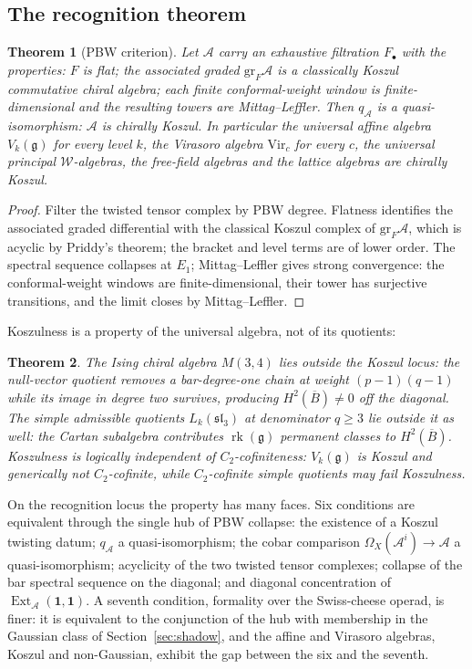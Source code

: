 \documentclass[11pt]{amsart}
\numberwithin{equation}{section}
\theoremstyle{plain}
\newtheorem{theorem}{Theorem}[section]
\theoremstyle{definition}
\theoremstyle{remark}
\newcommand{\cA}{\mathcal{A}}
\newcommand{\cW}{\mathcal{W}}
\newcommand{\fg}{\mathfrak{g}}
\newcommand{\barB}{\overline{B}}
\newcommand{\Vir}{\mathrm{Vir}}
\begin{document}
\subsection{The recognition theorem}

\begin{theorem}[PBW criterion]\label{thm:pbw}
Let $\cA$ carry an exhaustive filtration $F_\bullet$ with the properties:
$F$ is flat; the associated graded $\mathrm{gr}_F\cA$ is a classically
Koszul commutative chiral algebra; each finite conformal-weight window is
finite-dimensional and the resulting towers are Mittag--Leffler. Then
$q_{\cA}$ is a quasi-isomorphism: $\cA$ is chirally Koszul. In particular
the universal affine algebra $V_k(\fg)$ for every level $k$, the Virasoro
algebra $\Vir_c$ for every $c$, the universal principal
$\cW$-algebras, the free-field algebras and the lattice algebras are
chirally Koszul.
\end{theorem}

\begin{proof}
Filter the twisted tensor complex by PBW degree. Flatness identifies the
associated graded differential with the classical Koszul complex of
$\mathrm{gr}_F\cA$, which is acyclic by Priddy's theorem; the bracket and
level terms are of lower order. The spectral sequence collapses at $E_1$;
Mittag--Leffler gives strong convergence: the conformal-weight windows are
finite-dimensional, their tower has surjective transitions, and the
limit closes by Mittag--Leffler.
\end{proof}

Koszulness is a property of the universal algebra, not of its quotients:

\begin{theorem}\label{thm:non-koszul}
The Ising chiral algebra $M(3,4)$ lies outside the Koszul locus: the null-vector
quotient removes a bar-degree-one chain at weight $(p-1)(q-1)$ while its
image in degree two survives, producing $H^{2}(\barB)\neq0$ off the
diagonal. The simple admissible quotients $L_k(\mathfrak{sl}_3)$ at
denominator $q\geq3$ lie outside it as well: the Cartan subalgebra
contributes $\operatorname{rk}(\fg)$ permanent classes to $H^{2}(\barB)$.
Koszulness is logically independent of $C_2$-cofiniteness: $V_k(\fg)$ is
Koszul and generically not $C_2$-cofinite, while $C_2$-cofinite simple
quotients may fail Koszulness.
\end{theorem}

On the recognition locus the property has many faces. Six conditions are
equivalent through the single hub of PBW collapse: the existence of a
Koszul twisting datum; $q_{\cA}$ a quasi-isomorphism; the cobar comparison
$\Omega_X(\cA^{i})\to\cA$ a quasi-isomorphism; acyclicity of the two
twisted tensor complexes; collapse of the bar spectral sequence on the
diagonal; and diagonal concentration of
$\operatorname{Ext}_{\cA}(\mathbf{1},\mathbf{1})$. A seventh condition,
formality over the Swiss-cheese operad, is finer: it is equivalent to
the conjunction of the hub with membership in the Gaussian class of
Section~\ref{sec:shadow}, and the affine and Virasoro algebras, Koszul
and non-Gaussian, exhibit the gap between the six and the seventh.
\end{document}
